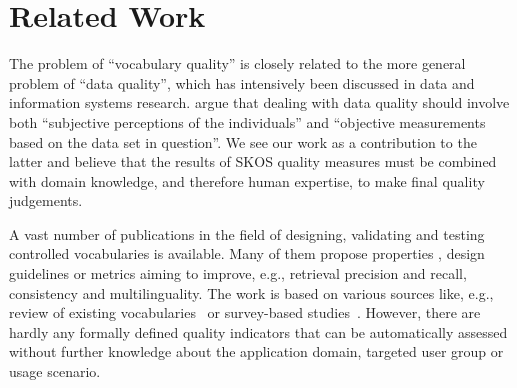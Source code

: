 \section{Related Work}\label{sec:related_work}

The problem of ``vocabulary quality'' is closely related to the more general problem of “data quality”, which has intensively been discussed in data and information systems research. \cite{Pipino2002,Batini2009} argue that dealing with data quality should involve both “subjective perceptions of the individuals” and “objective measurements based on the data set in question”. We see our work as a contribution to the latter and believe that the results of SKOS quality measures must be combined with domain knowledge, and therefore human expertise, to make final quality judgements.

A vast number of publications in the field of designing, validating and testing controlled vocabularies is available. Many of them propose properties \cite{Soergel1995}, design guidelines \cite{Svenonius2003,...} or metrics \cite{Elkin2002,Kless2010} aiming to improve, e.g., retrieval precision and recall, consistency and multilinguality. The work is based on various sources like, e.g., review of existing vocabularies~\cite{Soergel1995} or survey-based studies~\cite{Pinto2008}. However, there are hardly any formally defined quality indicators that can be automatically assessed without further knowledge about the application domain, targeted user group or usage scenario.



